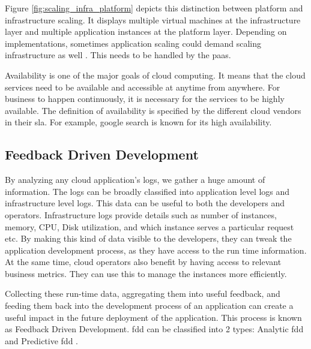 \documentclass[article,type=msc,colorback,12pt,accentcolor=tud8b,table]{tudthesis}
\begin{document}
		Figure \ref{fig:scaling_infra_platform} depicts this distinction between platform and infrastructure scaling. It displays multiple virtual machines at the infrastructure layer and multiple application instances at the platform layer. Depending on implementations, sometimes application scaling could demand scaling infrastructure as well \cite{cf_scale}. This needs to be handled by the \gls{paas}. 
		
		\par Availability is one of the major goals of cloud computing. It means that the cloud services need to be available and accessible at anytime from anywhere. For business to happen continuously, it is necessary for the services to be highly available. The definition of availability is specified by the different cloud vendors in their \gls{sla}. For example, google search is known for its high availability.	
		
		\subsection{Feedback Driven Development } 		
		
		By analyzing any cloud application's logs, we gather a huge amount of information. The logs can be broadly classified into application level logs and infrastructure level logs. This data can be useful to both the developers and operators. Infrastructure logs provide details such as number of instances, memory, CPU, Disk utilization, and which instance serves a particular request etc. By making this kind of data visible to the developers, they can tweak the application development process, as they have access to the run time information. At the same time, cloud operators also benefit by having access to relevant business metrics. They can use this to manage the instances more efficiently. 
		
		\par Collecting these run-time data, aggregating them into useful feedback, and feeding them back into the development process of an application can create a useful impact in the future deployment of the application. This process is known as Feedback Driven Development. \gls{fdd} can be classified into 2 types: Analytic \gls{fdd} and Predictive \gls{fdd} \cite{cito2015runtime}.
		
\end{document}
